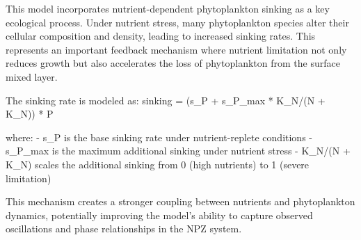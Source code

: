 This model incorporates nutrient-dependent phytoplankton sinking as a key ecological process. Under nutrient stress, many phytoplankton species alter their cellular composition and density, leading to increased sinking rates. This represents an important feedback mechanism where nutrient limitation not only reduces growth but also accelerates the loss of phytoplankton from the surface mixed layer.

The sinking rate is modeled as:
sinking = (s_P + s_P_max * K_N/(N + K_N)) * P

where:
- s_P is the base sinking rate under nutrient-replete conditions
- s_P_max is the maximum additional sinking under nutrient stress
- K_N/(N + K_N) scales the additional sinking from 0 (high nutrients) to 1 (severe limitation)

This mechanism creates a stronger coupling between nutrients and phytoplankton dynamics, potentially improving the model's ability to capture observed oscillations and phase relationships in the NPZ system.
